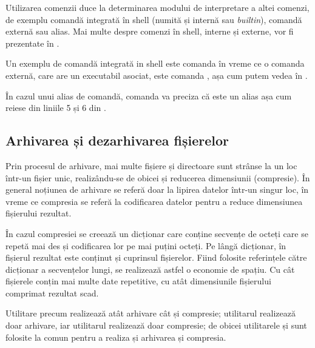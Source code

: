 Utilizarea comenzii  duce la determinarea modului de interpretare a altei comenzi, de exemplu comandă integrată în shell (numită și internă sau \textit{builtin}), comandă externă sau alias.
Mai multe despre comenzi în shell, interne și externe, vor fi prezentate în .

Un exemplu de comandă integrată in shell este comanda  în vreme ce o comanda externă, care are un executabil asociat, este comanda , așa cum putem vedea în .


În cazul unui alias de comandă, comanda  va preciza că este un alias așa cum reiese din liniile 5 și 6 din .

\subsection{Arhivarea și dezarhivarea fișierelor}
\label{sec:fs:archive}

Prin procesul de arhivare, mai multe fișiere și directoare sunt strânse la un loc într-un fișier unic, realizându-se de obicei și reducerea dimensiunii (compresie).
În general noțiunea de arhivare se referă doar la lipirea datelor într-un singur loc, în vreme ce compresia se referă la codificarea datelor pentru a reduce dimensiunea fișierului rezultat.

În cazul compresiei se creează un dicționar care conține secvențe de octeți care se repetă mai des și codificarea lor pe mai puțini octeți.
Pe lângă dicționar, în fișierul rezultat este conținut și cuprinsul fișierelor.
Fiind folosite referințele către dicționar a secvențelor lungi, se realizează astfel o economie de spațiu.
Cu cât fișierele conțin mai multe date repetitive, cu atât dimensiunile fișierului comprimat rezultat scad.

Utilitare precum  realizează atât arhivare cât și compresie;
utilitarul  realizează doar arhivare, iar utilitarul  realizează doar compresie;
de obicei utilitarele  și  sunt folosite la comun pentru a realiza și arhivarea și compresia.

